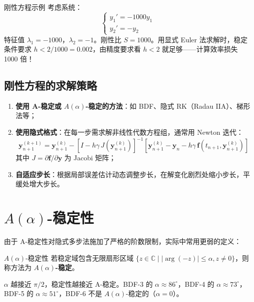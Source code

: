 \begin{example}{刚性方程示例}
	考虑系统：
	\[
	\begin{cases}
		y_1' = -1000 y_1 \\
		y_2' = -y_2
	\end{cases}
	\]
	特征值 $\lambda_1 = -1000$，$\lambda_2 = -1$。刚性比 $S = 1000$。用显式 Euler 法求解时，稳定条件要求 $h < 2/1000 = 0.002$，由精度要求看 $h < 2$ 就足够——计算效率损失 1000 倍！
\end{example}

\subsection{刚性方程的求解策略}

\begin{enumerate}
	\item \textbf{使用 A-稳定或 $A(\alpha)$-稳定的方法}：如 BDF、隐式 RK（Radau IIA）、梯形法等；
	\item \textbf{使用隐式格式}：在每一步需求解非线性代数方程组，通常用 Newton 迭代：
	\[
	\mathbf{y}_{n+1}^{(k+1)} = \mathbf{y}_{n+1}^{(k)} - \left[ I - h \gamma \, J(\mathbf{y}_{n+1}^{(k)}) \right]^{-1} \left[ \mathbf{y}_{n+1}^{(k)} - \mathbf{y}_n - h \gamma \, \mathbf{f}(t_{n+1}, \mathbf{y}_{n+1}^{(k)}) \right]
	\]
	其中 $J = \partial \mathbf{f}/\partial \mathbf{y}$ 为 Jacobi 矩阵；
	\item \textbf{自适应步长}：根据局部误差估计动态调整步长，在解变化剧烈处缩小步长，平缓处增大步长。
\end{enumerate}

\section{$A(\alpha)$-稳定性}

由于 A-稳定性对隐式多步法施加了严格的阶数限制，实际中常用更弱的定义：

\begin{mydefinition}{$A(\alpha)$-稳定性}
	若稳定域包含无限扇形区域 $\{ z \in \mathbb{C} \mid |\arg(-z)| \le \alpha, z \neq 0 \}$，则称方法为 \textbf{$A(\alpha)$-稳定}。
\end{mydefinition}

\begin{remark}
	$\alpha$ 越接近 $\pi/2$，稳定性越接近 A-稳定。BDF-3 的 $\alpha \approx 86^{\circ}$，BDF-4 的 $\alpha \approx 73^{\circ}$，BDF-5 的 $\alpha \approx 51^{\circ}$，BDF-6 不是 $A(\alpha)$-稳定的（$\alpha = 0$）。
\end{remark}

